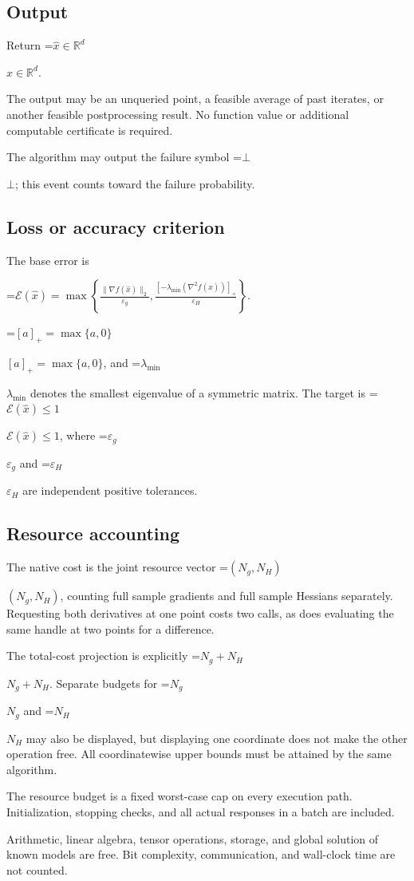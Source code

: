 \documentclass[10pt,a4paper]{article}
\newcommand{\AtlasMath}[1]{\par\begingroup\centering\setbox0=\hbox{$\displaystyle #1$}\ifdim\wd0>1.4\linewidth\typeout{ATLAS WIDE FORMULA: \the\wd0}\fi\ifdim\wd0>\linewidth\resizebox{\linewidth}{!}{\box0}\else\box0\fi\par\endgroup}
\newcommand{\AtlasInlineMath}[1]{\begingroup\setbox0=\hbox{$#1$}\ifdim\wd0>.4\linewidth\endgroup\AtlasMath{#1}\else\endgroup$#1$\fi}
\begin{document}
\subsection{Output}
Return \AtlasInlineMath{\widehat{x}\in \mathbb{R}^d}.

The output may be an unqueried point, a feasible average of past iterates, or another feasible postprocessing result. No function value or additional computable certificate is required.

The algorithm may output the failure symbol \AtlasInlineMath{\bot}; this event counts toward the failure probability.

\subsection{Loss or accuracy criterion}
The base error is


\AtlasMath{\mathcal{E}(\widehat{x})=\max\left\{\frac{\|\nabla f(\widehat{x})\|_2}{\varepsilon_g},\frac{[-\lambda_{\min}(\nabla^2f(\widehat{x}))]_+}{\varepsilon_H}\right\}.}


\AtlasInlineMath{[a]_+=\max\{a,0\}}, and \AtlasInlineMath{\lambda_{\min}} denotes the smallest eigenvalue of a symmetric matrix. The target is \AtlasInlineMath{\mathcal{E}(\widehat{x})\le1}, where \AtlasInlineMath{\varepsilon_g} and \AtlasInlineMath{\varepsilon_H} are independent positive tolerances.

\subsection{Resource accounting}
The native cost is the joint resource vector \AtlasInlineMath{(N_g,N_H)}, counting full sample gradients and full sample Hessians separately. Requesting both derivatives at one point costs two calls, as does evaluating the same handle at two points for a difference.

The total-cost projection is explicitly \AtlasInlineMath{N_g+N_H}. Separate budgets for \AtlasInlineMath{N_g} and \AtlasInlineMath{N_H} may also be displayed, but displaying one coordinate does not make the other operation free. All coordinatewise upper bounds must be attained by the same algorithm.

The resource budget is a fixed worst-case cap on every execution path. Initialization, stopping checks, and all actual responses in a batch are included.

Arithmetic, linear algebra, tensor operations, storage, and global solution of known models are free. Bit complexity, communication, and wall-clock time are not counted.
\end{document}
